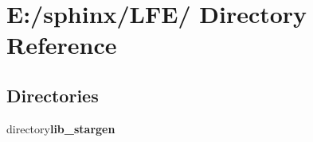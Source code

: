 \section{E:/sphinx/LFE/ Directory Reference}
\label{dir_000002}
\subsection*{Directories}
\begin{CompactItemize}
\item 
directory{\bf lib\_\-stargen}
\end{CompactItemize}
